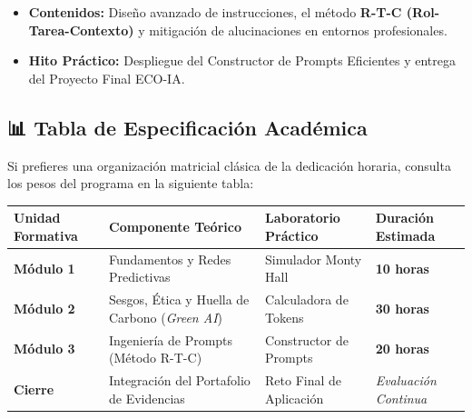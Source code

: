 \documentclass[
  spanish,
  letterpaper,
  DIV=11,
  numbers=noendperiod,
  oneside]{scrreprt}
\newcounter{none} %
\providecommand{\tightlist}{%
  \setlength{\itemsep}{0pt}\setlength{\parskip}{0pt}}
\begin{document}
\begin{itemize}
\tightlist
\item
  \textbf{Contenidos:} Diseño avanzado de instrucciones, el método
  \textbf{R-T-C (Rol-Tarea-Contexto)} y mitigación de alucinaciones en
  entornos profesionales.
\item
  \textbf{Hito Práctico:} Despliegue del Constructor de Prompts
  Eficientes y entrega del Proyecto Final ECO-IA.
\end{itemize}

\subsection{📊 Tabla de Especificación Académica}

Si prefieres una organización matricial clásica de la dedicación
horaria, consulta los pesos del programa en la siguiente tabla:

{\def\LTcaptype{none} %
\begin{longtable}[]{@{}
  >{\raggedright\arraybackslash}p{}
  >{\raggedright\arraybackslash}p{}
  >{\raggedright\arraybackslash}p{}
  >{\centering\arraybackslash}p{}@{}}
\toprule\noalign{}
\begin{minipage}[b]{\linewidth}\raggedright
Unidad Formativa
\end{minipage} & \begin{minipage}[b]{\linewidth}\raggedright
Componente Teórico
\end{minipage} & \begin{minipage}[b]{\linewidth}\raggedright
Laboratorio Práctico
\end{minipage} & \begin{minipage}[b]{\linewidth}\centering
Duración Estimada
\end{minipage} \\
\midrule\noalign{}
\endhead
\bottomrule\noalign{}
\endlastfoot
\textbf{Módulo 1} & Fundamentos y Redes Predictivas & Simulador Monty
Hall & \textbf{10 horas} \\
\textbf{Módulo 2} & Sesgos, Ética y Huella de Carbono (\emph{Green AI})
& Calculadora de Tokens & \textbf{30 horas} \\
\textbf{Módulo 3} & Ingeniería de Prompts (Método R-T-C) & Constructor
de Prompts & \textbf{20 horas} \\
\textbf{Cierre} & Integración del Portafolio de Evidencias & Reto Final
de Aplicación & \emph{Evaluación Continua} \\
\end{longtable}
}
\end{document}
